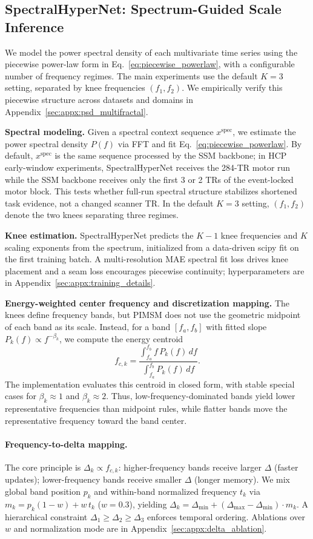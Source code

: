 \documentclass{article}
\begin{document}
\subsection{SpectralHyperNet: Spectrum-Guided Scale Inference}

We model the power spectral density of each multivariate time series using the piecewise power-law form in Eq.~\eqref{eq:piecewise_powerlaw}, with a configurable number of frequency regimes. The main experiments use the default $K=3$ setting, separated by knee frequencies $(f_1, f_2)$.
We empirically verify this piecewise structure across datasets and domains in Appendix~\ref{sec:appx:psd_multifractal}.

\textbf{Spectral modeling.} Given a spectral context sequence $x^{\mathrm{spec}}$, we estimate the power spectral density $P(f)$ via FFT and fit Eq.~\eqref{eq:piecewise_powerlaw}. By default, $x^{\mathrm{spec}}$ is the same sequence processed by the SSM backbone; in HCP early-window experiments, SpectralHyperNet receives the 284-TR motor run while the SSM backbone receives only the first 3 or 2 TRs of the event-locked motor block. This tests whether full-run spectral structure stabilizes shortened task evidence, not a changed scanner TR. In the default $K=3$ setting, $(f_1, f_2)$ denote the two knees separating three regimes.

\textbf{Knee estimation.} SpectralHyperNet predicts the $K-1$ knee frequencies and $K$ scaling exponents from the spectrum, initialized from a data-driven scipy fit on the first training batch. A multi-resolution MAE spectral fit loss drives knee placement and a seam loss encourages piecewise continuity; hyperparameters are in Appendix~\ref{sec:appx:training_details}.

\textbf{Energy-weighted center frequency and discretization mapping.} The knees define frequency bands, but PIMSM does not use the geometric midpoint of each band as its scale. Instead, for a band $[f_a,f_b]$ with fitted slope $P_k(f)\propto f^{-\beta_k}$, we compute the energy centroid
\[
f_{c,k}=\frac{\int_{f_a}^{f_b} f\,P_k(f)\,df}{\int_{f_a}^{f_b} P_k(f)\,df}.
\]
The implementation evaluates this centroid in closed form, with stable special cases for $\beta_k\approx 1$ and $\beta_k\approx 2$. Thus, low-frequency-dominated bands yield lower representative frequencies than midpoint rules, while flatter bands move the representative frequency toward the band center.

\paragraph{Frequency-to-delta mapping.}
The core principle is $\Delta_k \propto f_{c,k}$: higher-frequency bands receive larger $\Delta$ (faster updates); lower-frequency bands receive smaller $\Delta$ (longer memory).
We mix global band position $p_k$ and within-band normalized frequency $t_k$ via $m_k = p_k(1-w) + w\,t_k$ ($w=0.3$), yielding $\Delta_k = \Delta_{\min} + (\Delta_{\max} - \Delta_{\min})\cdot m_k$.
A hierarchical constraint $\Delta_1 \ge \Delta_2 \ge \Delta_3$ enforces temporal ordering. Ablations over $w$ and normalization mode are in Appendix~\ref{sec:appx:delta_ablation}.
\end{document}
